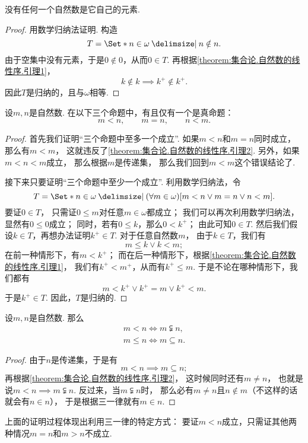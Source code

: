 \begin{lemma}\label{theorem:集合论.自然数的线性序.引理2}
没有任何一个自然数是它自己的元素.
\begin{proof}
用数学归纳法证明.
构造\[
	T = \Set*{ n \in \omega \given n \notin n }.
\]
由于空集中没有元素，于是\(0 \notin 0\)，从而\(0 \in T\).
再根据\cref{theorem:集合论.自然数的线性序.引理1}，\[
	k \notin k
	\implies
	k^+ \notin k^+.
\]
因此\(T\)是归纳的，且与\(\omega\)相等.
\end{proof}
\end{lemma}

\begin{theorem}\label{theorem:集合论.自然数集的三一律}
设\(m,n\)是自然数.
在以下三个命题中，有且仅有一个是真命题：\[
	m < n, \qquad
	m = n, \qquad
	n < m.
\]
\begin{proof}
首先我们证明“三个命题中至多一个成立”.
如果\(m < n\)和\(m = n\)同时成立，
那么有\(m < m\)，
这就违反了\cref{theorem:集合论.自然数的线性序.引理2}.
另外，如果\(m < n < m\)成立，
那么根据\(m\)是传递集，
那么我们回到\(m < m\)这个错误结论了.

接下来只要证明“三个命题中至少一个成立”.
利用数学归纳法，令\[
	T = \Set*{
		n \in \omega
		\given
		(\forall m \in \omega)
		[
			m < n
			\lor
			m = n
			\lor
			n < m
		]
	}.
\]
要证\(0 \in T\)，
只需证\(0 \leqslant m\)对任意\(m \in \omega\)都成立；
我们可以再次利用数学归纳法，
显然有\(0 \leqslant 0\)成立；
同时，若有\(0 \leqslant k\)，那么\(0 < k^+\)；
由此可知\(0 \in T\).
然后我们假设\(k \in T\)，再想办法证明\(k^+ \in T\).
对于任意自然数\(m\)，
由于\(k \in T\)，我们有\[
	m \leqslant k
	\lor
	k < m;
\]
在前一种情形下，有\(m < k^+\)；
而在后一种情形下，根据\cref{theorem:集合论.自然数的线性序.引理1}，
我们有\(k^+ < m^+\)，从而有\(k^+ \leqslant m\).
于是不论在哪种情形下，我们都有\[
	m < k^+
	\lor
	k^+ = m
	\lor
	k^+ < m.
\]
于是\(k^+ \in T\).
因此，\(T\)是归纳的.
\end{proof}
\end{theorem}

\begin{corollary}
设\(m,n\)是自然数.
那么\begin{gather*}
	m < n \iff m \subsetneqq n, \\
	m \leqslant n \iff m \subseteq n.
\end{gather*}
\begin{proof}
由于\(n\)是传递集，于是有\[
	m < n \implies m \subseteq n;
\]
再根据\cref{theorem:集合论.自然数的线性序.引理2}，
这时候同时还有\(m \neq n\)，
也就是说\(m < n \implies m \subsetneqq n\).
反过来，当\(m \subsetneqq n\)时，
那么必有\(m \neq n\)且\(n \notin m\)（不这样的话就会有\(n \in n\)），
于是根据三一律就有\(m \in n\).
\end{proof}
\end{corollary}
上面的证明过程体现出利用三一律的特定方式：
要证\(m < n\)成立，只需证其他两种情况\(m = n\)和\(m > n\)不成立.

